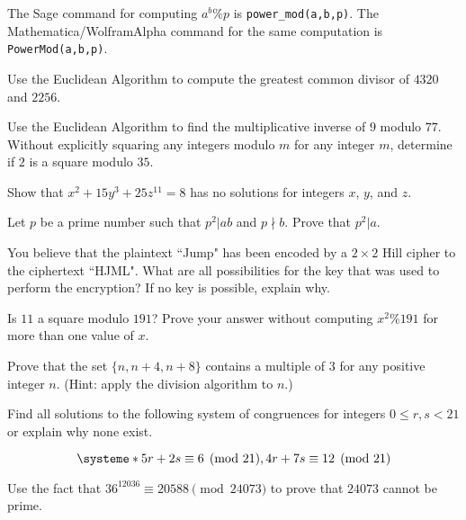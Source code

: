 \documentclass[11pt,addpoints,letterpaper]{exam}
\begin{document}
The Sage command for computing $a^b\%p$ is \verb|power_mod(a,b,p)|. The Mathematica/WolframAlpha command for the same computation is \verb|PowerMod(a,b,p)|. 
\vfill





\newpage

\begin{questions}
\question Use the Euclidean Algorithm to compute the greatest common divisor of $4320$ and $2256$.
\vfill

\question Use the Euclidean Algorithm to find the multiplicative inverse of $9$ modulo $77$.
\vfill 
 \newpage
 \question Without explicitly squaring any integers modulo $m$ for any integer $m$, determine if $2$ is a square modulo $35$. 

\vfill
\question Show that $x^2+15y^3+25z^{11}=8$ has no solutions for integers $x$, $y$, and $z$. 
\vfill
    \newpage


\question Let $p$ be a prime number such that $p^2|ab$ and $p\nmid b$. Prove that $p^2|a$. 
          
          
          \bigskip
   
  
   \newpage
    \question  You believe that the plaintext ``Jump" has been encoded by a $2\times 2$ Hill cipher to the ciphertext ``HJML".  What are all possibilities for the key that was used to perform the encryption? If no key is possible, explain why. 
   

  
   \vfill
 
   \question Is $11$ a square modulo $191$? Prove your answer without computing $x^2\%191$ for more than one value of $x$.  

\vfill
\newpage
\question Prove that the set $\{n,n+4, n+8\}$ contains a multiple of $3$ for any positive integer $n$.  (Hint: apply the division algorithm to $n$.)
\vfill




\question Find all solutions to the following system of congruences for integers $0\le r,s<21$ or explain why none exist. 

$$\systeme*{5r+2s\equiv 6 \pmod{21}, 4r+7s\equiv 12\pmod{21}}$$

 \vfill

 \newpage

\question Use the fact that $36^{12036}\equiv 20588 \pmod{24073}$ to prove that $24073$ cannot be prime. 
\vfill


\end{questions}
\end{document}
